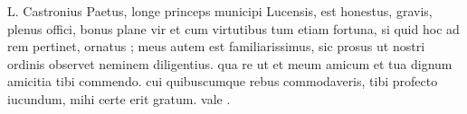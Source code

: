 


 L. Castronius Paetus, longe princeps municipi Lucensis, est honestus, gravis, plenus offici, bonus plane vir et cum virtutibus tum etiam fortuna, si quid hoc ad rem pertinet, ornatus ; meus autem est familiarissimus, sic prosus ut nostri ordinis observet neminem diligentius. qua re ut et meum amicum et tua dignum amicitia tibi commendo. cui quibuscumque rebus commodaveris, tibi profecto iucundum, mihi certe erit gratum. vale .
